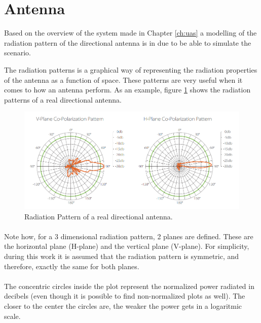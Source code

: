 \section{Antenna}\label{sec:antenna}

Based on the overview of the system made in Chapter \ref{ch:uas} a modelling of the radiation pattern of the directional antenna is in due to be able to simulate the scenario.

The radiation patterns is a graphical way of representing the radiation properties of the antenna as a function of space. These patterns are very useful when it comes to how an antenna perform. As an example, figure \ref{fig:radpattern} shows the radiation patterns of a real directional antenna.

\begin{figure}[H]
	\centerline{
	\includegraphics[scale=0.45]{figures/radpattern.png}}
	\caption{Radiation Pattern of a real directional antenna.}
	\label{fig:radpattern}
\end{figure}

\paragraph{}Note how, for a 3 dimensional radiation pattern, 2 planes are defined. These are the horizontal plane (H-plane) and the vertical plane (V-plane). For simplicity, during this work it is assumed that the radiation pattern is symmetric, and therefore, exactly the same for both planes.

\paragraph{}The concentric circles inside the plot represent the normalized power radiated in decibels (even though it is possible to find non-normalized plots as well). The closer to the center the circles are, the weaker the power gets in a logaritmic scale.


